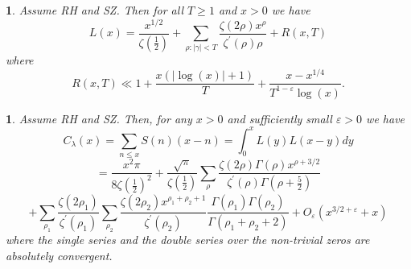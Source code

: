 \documentclass[10pt,a4paper]{amsart}
\newtheorem{thm}{}
\newtheorem{cor}{}
\begin{document}
\begin{cor}
\label{cor:IMP}Assume RH and SZ. Then for all $T\geq1$ and $x>0$
we have
\[
L(x)=\frac{x^{1/2}}{\zeta\left(\frac{1}{2}\right)}+\sum_{\rho:\left|\gamma\right|<T}\frac{\zeta\left(2\rho\right)x^{\rho}}{\zeta^{\prime}\left(\rho\right)\rho}+R\left(x,T\right)
\]
where
\[
R\left(x,T\right)\ll1+\frac{x\left(\left|\log\left(x\right)\right|+1\right)}{T}+\frac{x-x^{1/4}}{T^{1-\varepsilon}\log\left(x\right)}.
\]
\end{cor}

\begin{thm}
\label{thm:convol}Assume RH and SZ. Then, for any $x>0$ and sufficiently
small $\varepsilon>0$ we have
\[
  C_\lambda(x)
  =
\sum_{n\leq x}S\left(n\right)\left(x-n\right)=\int_{0}^{x}L\left(y\right)L\left(x-y\right)dy
\]
\[
=\frac{x^{2}\pi}{8\zeta\left(\frac{1}{2}\right)^{2}}+\frac{\sqrt{\pi}}{\zeta\left(\frac{1}{2}\right)}\sum_{\rho}\frac{\zeta\left(2\rho\right)\Gamma\left(\rho\right)x^{\rho+3/2}}{\zeta^{\prime}\left(\rho\right)\Gamma\left(\rho+\frac{5}{2}\right)}
\]
\[
+\sum_{\rho_{1}}\frac{\zeta\left(2\rho_{1}\right)}{\zeta^{\prime}\left(\rho_{1}\right)}\sum_{\rho_{2}}\frac{\zeta\left(2\rho_{2}\right)x^{\rho_{1}+\rho_{2}+1}}{\zeta^{\prime}\left(\rho_{2}\right)}\frac{\Gamma\left(\rho_{1}\right)\Gamma\left(\rho_{2}\right)}{\Gamma\left(\rho_{1}+\rho_{2}+2\right)}+O_{\varepsilon}\left(x^{3/2+\varepsilon}+x\right)
\]
where the single series and the double series over the non-trivial
zeros are absolutely convergent.
\end{thm}
\end{document}
